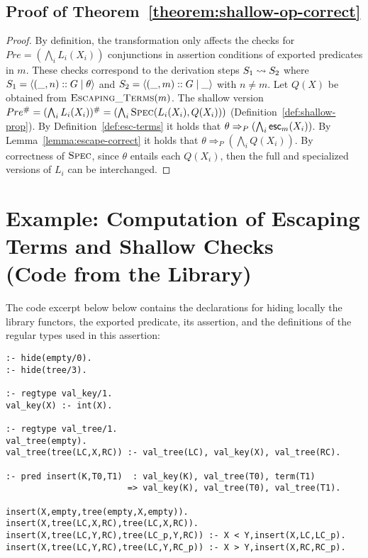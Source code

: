 \documentclass{llncs}
\begin{document}
\ \\
\ \\
\subsection{Proof of Theorem~\ref{theorem:shallow-op-correct}}

\begin{proof}
  By definition, the transformation only affects the checks for
  $Pre=(\bigwedge_i L_i(X_i))$ conjunctions in assertion conditions of
  exported predicates in $m$.
  These checks correspond to the derivation steps
  $S_1 \leadsto S_2$ where
  $S_1 = \langle (\_,n)::G \mid{} \theta \rangle$ and $S_2 = \langle (\_,m)::G \mid{} \_ \rangle$
  with $n \neq m$. %
  Let $Q(X)$ be obtained from $\textsc{Escaping\_Terms}(m)$.
  The shallow version $Pre^{\#} = (\bigwedge_i L_i(X_i))^{\#} =
  (\bigwedge_i \textsc{Spec}(L_i(X_i), Q(X_i)))$
  (Definition~\ref{def:shallow-prop}).
  By Definition~\ref{def:esc-terms} it holds that $\theta
  \Rightarrow_{P} (\bigwedge_i \mathsf{esc}_{m}(X_i))$.
  By Lemma~\ref{lemma:escape-correct} it holds that $\theta
  \Rightarrow_{P} (\bigwedge_i Q(X_i))$.
  By correctness of $\textsc{Spec}$, since $\theta$ entails each
  $Q(X_i)$, then the full and specialized versions of $L_i$ can be
  interchanged.
\end{proof}

\clearpage

\section{ Example: Computation of Escaping Terms and Shallow Checks \\
          (Code from the  Library)}
\label{app:example}

The code excerpt below below contains
the declarations for hiding locally the  library functors,
the exported  predicate,
its assertion,
and the definitions of the regular types used in this assertion:

{\small%
\begin{verbatim}
:- hide(empty/0).
:- hide(tree/3).

:- regtype val_key/1.
val_key(X) :- int(X).

:- regtype val_tree/1.
val_tree(empty).
val_tree(tree(LC,X,RC)) :- val_tree(LC), val_key(X), val_tree(RC).

:- pred insert(K,T0,T1)  : val_key(K), val_tree(T0), term(T1)
                        => val_key(K), val_tree(T0), val_tree(T1).

insert(X,empty,tree(empty,X,empty)).
insert(X,tree(LC,X,RC),tree(LC,X,RC)).
insert(X,tree(LC,Y,RC),tree(LC_p,Y,RC)) :- X < Y,insert(X,LC,LC_p).
insert(X,tree(LC,Y,RC),tree(LC,Y,RC_p)) :- X > Y,insert(X,RC,RC_p).
\end{verbatim}}
\end{document}
